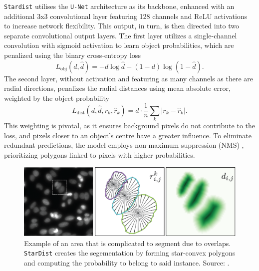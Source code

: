 \texttt{Stardist} utilises the \texttt{U-Net} architecture \cite{RonnebergerFB15} as its backbone, enhanced with an additional 3x3 convolutional layer featuring 128 channels and ReLU activations to increase network flexibility. This output, in turn, is then directed into two separate convolutional output layers. The first layer utilizes a single-channel convolution with sigmoid activation to learn object probabilities, which are penalized using the binary cross-entropy loss
\begin{equation}\label{eqbceloss}
	L_{\text{obj}}(d,\hat{d})=-d\log\hat{d}-(1-d)\log(1-\hat{d}).
\end{equation}
The second layer, without activation and featuring as many channels as there are radial directions, penalizes the radial distances using mean absolute error, weighted by the object probability
\begin{equation}
	L_{\text{dist}}(d,\hat{d},r_k,\hat{r}_k)=d\cdot\frac{1}{n}\sum_k|r_k-\hat{r}_k|.
\end{equation}
This weighting is pivotal, as it ensures background pixels do not contribute to the loss, and pixels closer to an object's centre have a greater influence. To eliminate redundant predictions, the model employs non-maximum suppression (NMS) \cite{hosang2017learning, ren2016faster}, prioritizing polygons linked to pixels with higher probabilities.

\begin{figure}
	\centering
	\includegraphics[width=\textwidth]{"images/star_convexity_explained.png"}
	\caption[\texttt{StarDist} summarized]{Example of an area that is complicated to segment due to overlaps. \texttt{StarDist} creates the segementation by forming star-convex polygons and computing the probability to belong to said instance. Source: \Cite{schmidt2018}.}
	\label{figstardistexplained}
\end{figure}
